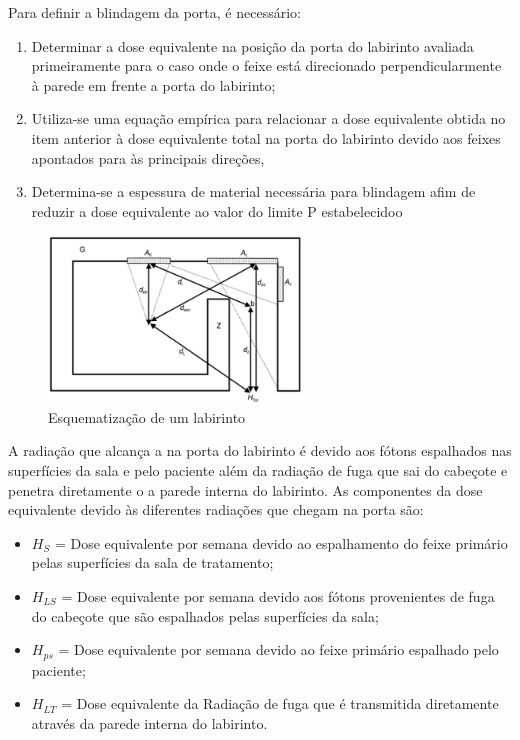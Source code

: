 \documentclass[11pt,a4paper]{article}
\begin{document}
            Para definir a blindagem da porta, é necessário:

            \begin{enumerate}
                \item Determinar a dose equivalente na posição da porta do labirinto avaliada primeiramente para o caso onde o feixe está direcionado perpendicularmente à parede em frente a porta do labirinto;
                \item Utiliza-se uma equação empírica para relacionar a dose equivalente obtida no item anterior à dose equivalente total na porta do labirinto devido aos feixes apontados para às principais direções, 
                \item Determina-se a espessura de material necessária para blindagem afim de reduzir a dose equivalente ao valor do limite P estabelecidoo
            \end{enumerate}

            \begin{figure}[h]
                \centering
                \includegraphics[width=0.6\textwidth]{Imagens/esquemaLabirinto.JPG}
                \caption{Esquematização de um labirinto}
                \label{fig:esquemaLabirinto}
            \end{figure}

            A radiação que alcança a na porta do labirinto é devido aos fótons espalhados nas superfícies da sala e pelo paciente além da radiação de fuga que sai do cabeçote e penetra diretamente o a parede interna do labirinto. As componentes da dose equivalente devido às diferentes radiações que chegam na porta são:

            \begin{itemize}
                \item $H_S$ = Dose equivalente por semana devido ao espalhamento do feixe primário pelas superfícies da sala de tratamento;
                \item $H_{LS}$ = Dose equivalente por semana devido aos fótons provenientes de fuga do cabeçote que são espalhados pelas superfícies da sala;
                \item $H_{ps}$ = Dose equivalente por semana devido ao feixe primário espalhado pelo paciente;
                \item $H_{LT}$ = Dose equivalente da Radiação de fuga que é transmitida diretamente através da parede interna do labirinto.
            \end{itemize}
\end{document}
